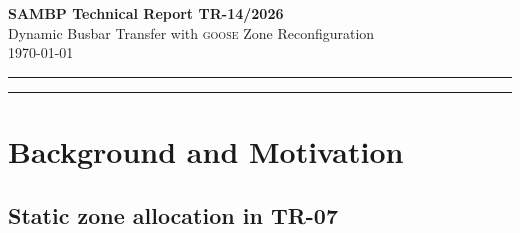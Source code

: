 \documentclass[11pt,a4paper]{article}
\newcommand{\goose}{\textsc{goose}}
\begin{document}

\begin{center}
  {\LARGE\bfseries SAMBP Technical Report TR-14/2026}\\[6pt]
  {\large Dynamic Busbar Transfer with \goose{} Zone Reconfiguration}\\[4pt]
  \today
\end{center}

\vspace{4pt}
\noindent\rule{\linewidth}{0.6pt}

\begin{abstract}
SAMBP TR-07 established the double-busbar 87B differential framework with
static zone allocation: each feeder is permanently assigned to Zone~1 (BB1)
or Zone~2 (BB2) at commissioning.  TR-07 identified dynamic zone
reconfiguration during busbar transfer as future work.  This report
implements a \texttt{BusbarTransferEngine} that listens to IEC~61850 \goose{}
messages from the bus-coupler and disconnector isolators and re-maps the
zone boundaries in real time.  Five busbar-transfer topologies are defined
--- normal (T1), transfer-in-progress (T2), post-transfer (T3),
split-bus (T4), and GOOSE-lag (T5) --- and a selectivity sweep across five
fault locations and two fault types yields 40/40~(100\%) correct
trip/no-trip decisions.  The T5 \goose{} lag scenario, in which the engine
uses a stale NORM zone assignment for up to 5\,ms after a transfer
completes, is also analysed: all 10~scenarios remain selective because bus
coupler CT placement preserves zone indication throughout the lag window.
\end{abstract}

\noindent\rule{\linewidth}{0.6pt}

\tableofcontents
\vspace{6pt}

\section{Background and Motivation}
\label{sec:background}

\subsection{Static zone allocation in TR-07}
\end{document}
